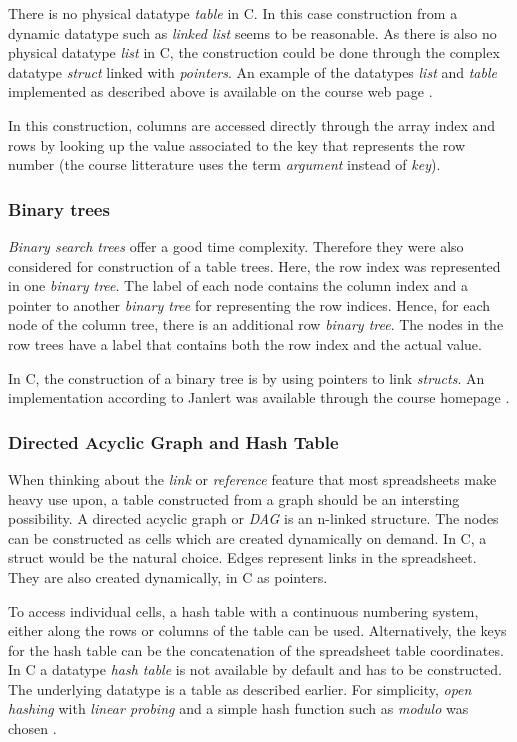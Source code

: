 \documentclass[a4paper,11pt,twoside]{article}
\begin{document}
There is no physical datatype \textit{table} in C. In this case construction
from a dynamic datatype such as \textit{linked list} seems to be reasonable. As
there is also no physical datatype \textit{list} in C, the construction could
be done through the complex datatype \textit{struct} linked with
\textit{pointers}. An example of the datatypes \textit{list} and
\textit{table} implemented as described above is available on the course
web page \cite{datatypes}.

In this construction, columns are accessed directly through the array
index and rows by looking up the value associated to the key that
represents the row number (the course litterature uses the term
\textit{argument} instead of \textit{key}\cite{janlert2000}).
 

\subsubsection{Binary trees}
\textit{Binary search trees} offer a good time complexity. Therefore
they were also considered for construction of a table trees. 
Here, the row index was represented in one \textit{binary tree}. The
label of each node contains the column index and a pointer to
another \textit{binary tree} for representing the row indices. 
Hence, for each node of the column tree, there is an additional row
\textit{binary tree}. The nodes in the row trees have a label that
contains both the row index and the actual value. 

In C, the construction of a binary tree is by using pointers to link
\textit{structs}. An implementation according to Janlert
\cite{janlert2000} was available through the course homepage \cite{datatypes}.



\subsubsection{Directed Acyclic Graph and Hash Table}
When thinking about the \emph{link} or \emph{reference} feature that most
spreadsheets make heavy use upon, a table constructed from a graph
should be an intersting possibility.  A directed acyclic graph or
\textit{DAG} is an n-linked structure. The nodes can be
constructed as cells which are created dynamically on demand. In C, a
struct would be the natural choice. Edges represent links in the
spreadsheet. They are also created dynamically, in C as pointers. 

To access individual cells, a hash table with a continuous numbering
system, either along the rows or columns of the table can be
used. Alternatively, the keys for the hash table can be the
concatenation of the spreadsheet table coordinates. In C a
datatype \textit{hash table} is not available by default and has to be
constructed. The underlying datatype is a table as described
earlier. For simplicity, \emph{open hashing} with \emph{linear
 probing} and a simple hash function such as \textit{modulo} was
chosen \cite[p. 277]{janlert2000}. 
\end{document}
